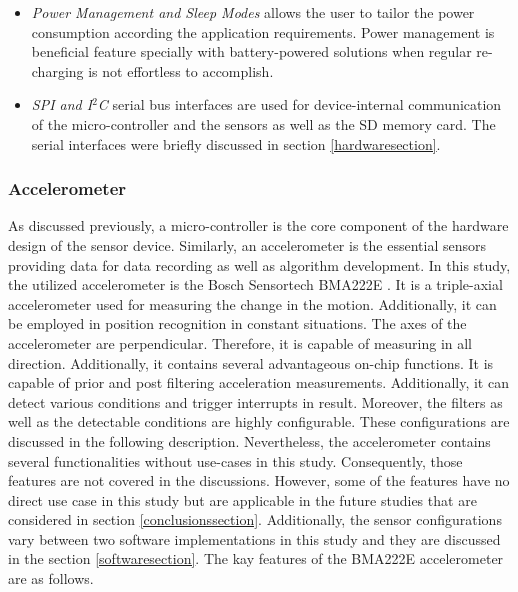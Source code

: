\documentclass[english,12pt,a4paper,pdftex,elec,utf8]{aaltothesis}
\begin{document}
\begin{itemize}
\item \textit{Power Management and Sleep Modes} allows the user to tailor the power consumption according the application requirements. Power management is beneficial feature specially with battery-powered solutions when regular re-charging is not effortless to accomplish.

\item \textit{SPI and I$^2$C} serial bus interfaces are used for device-internal communication of the micro-controller and the sensors as well as the SD memory card. The serial interfaces were briefly discussed in section \ref{hardwaresection}.

\end{itemize}

\subsubsection*{Accelerometer}

As discussed previously, a micro-controller is the core component of the hardware design of the sensor device. Similarly, an accelerometer is the essential sensors providing data for data recording as well as algorithm development. In this study, the utilized accelerometer is the Bosch Sensortech BMA222E \cite{bma222datasheet}. It is a triple-axial accelerometer used for measuring the change in the motion. Additionally, it can be employed in position recognition in constant situations. The axes of the accelerometer are perpendicular. Therefore, it is capable of measuring in all direction. Additionally, it contains several advantageous on-chip functions. It is capable of prior and post filtering acceleration measurements. Additionally, it can detect various conditions and trigger interrupts in result. Moreover, the filters as well as the detectable conditions are highly configurable. These configurations are discussed in the following description. Nevertheless, the accelerometer contains several functionalities without use-cases in this study. Consequently, those features are not covered in the discussions. However, some of the features have no direct use case in this study but are applicable in the future studies that are considered in section \ref{conclusionssection}. Additionally, the sensor configurations vary between two software implementations in this study and they are discussed in the section \ref{softwaresection}. The kay features of the BMA222E accelerometer are as follows.
\end{document}
